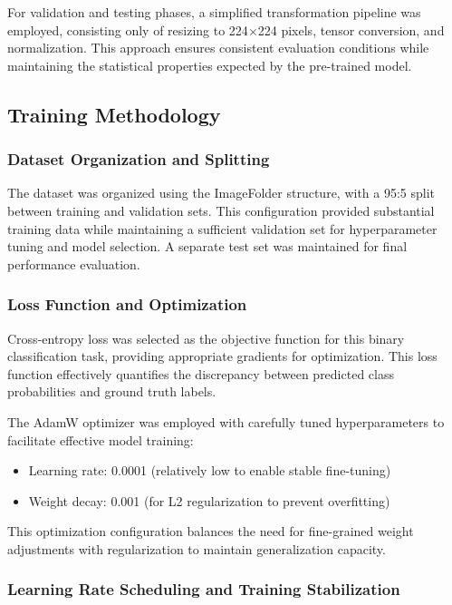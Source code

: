 For validation and testing phases, a simplified transformation pipeline was employed, consisting only of resizing to 224$\times$224 pixels, tensor conversion, and normalization. This approach ensures consistent evaluation conditions while maintaining the statistical properties expected by the pre-trained model.

\subsection{Training Methodology}

\subsubsection{Dataset Organization and Splitting}

The dataset was organized using the ImageFolder structure, with a 95:5 split between training and validation sets. This configuration provided substantial training data while maintaining a sufficient validation set for hyperparameter tuning and model selection. A separate test set was maintained for final performance evaluation.

\subsubsection{Loss Function and Optimization}

Cross-entropy loss was selected as the objective function for this binary classification task, providing appropriate gradients for optimization. This loss function effectively quantifies the discrepancy between predicted class probabilities and ground truth labels.

The AdamW optimizer was employed with carefully tuned hyperparameters to facilitate effective model training:
\begin{itemize}
    \item Learning rate: 0.0001 (relatively low to enable stable fine-tuning)
    \item Weight decay: 0.001 (for L2 regularization to prevent overfitting)
\end{itemize}

This optimization configuration balances the need for fine-grained weight adjustments with regularization to maintain generalization capacity.

\subsubsection{Learning Rate Scheduling and Training Stabilization}

